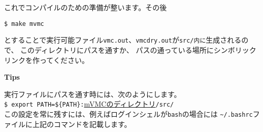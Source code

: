 これでコンパイルのための準備が整います。その後
\begin{verbatim}
$ make mvmc
\end{verbatim}

とすることで実行可能ファイル\verb|vmc.out|、\verb|vmcdry.out|が\verb|src/内に|生成されるので、
このディレクトリにパスを通すか、
パスの通っている場所にシンボリックリンクを作ってください。

\begin{screen}
\Large 
{\bf Tips}
\normalsize

実行ファイルにパスを通す時には、次のようにします。
\\
\verb|$ export PATH=${PATH}:|\underline{mVMCのディレクトリ}\verb|/src/|
\\
この設定を常に残すには、例えばログインシェルが\verb|bash|の場合には
\verb|~/.bashrc|ファイルに上記のコマンドを記載します。
\end{screen}

